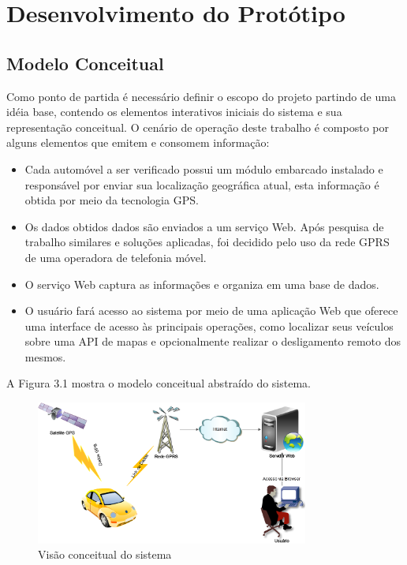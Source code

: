 \chapter{Desenvolvimento do Protótipo}
\label{cap:desenvolvimento do prototipo}

\section{Modelo Conceitual}
Como ponto de partida é necessário definir o escopo do projeto partindo de uma idéia base, 
contendo os elementos interativos iniciais do sistema e sua representação conceitual. O cenário de operação
deste trabalho é composto por alguns elementos que emitem e consomem informação:

\begin{itemize}
	\item Cada automóvel a ser verificado possui um módulo embarcado instalado e responsável por enviar sua 
	localização geográfica atual, esta informação é obtida por meio da tecnologia GPS. 
	\item  Os dados obtidos dados são enviados a um serviço Web. Após pesquisa de trabalho similares e soluções aplicadas,
	foi decidido pelo uso da rede GPRS de uma operadora de telefonia móvel.
  \item O serviço Web captura as informações e organiza em uma base de dados. 
	\item O usuário fará acesso ao sistema por meio de uma aplicação Web que oferece uma interface 
	de acesso às principais operações, como localizar seus veículos sobre uma API de mapas e opcionalmente 
	realizar o desligamento remoto dos mesmos. 
\end{itemize}

A Figura 3.1 mostra o modelo conceitual abstraído do sistema.

\begin{figure}[!htb]
\centering
\includegraphics[width=0.8\textwidth]{figures/1_conceitual.png}
\caption{Visão conceitual do sistema}
\label{1}
\end{figure}

